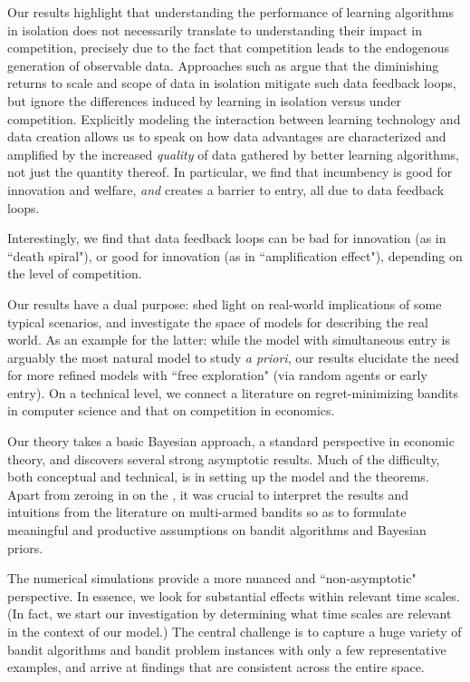 Our results highlight that understanding the performance of learning algorithms in isolation does not necessarily translate to understanding their impact in competition, precisely due to the fact that competition leads to the endogenous generation of observable data. Approaches such as \citet{lambrecht2015can, bajari2018impact, varian2018artificial} argue that the diminishing returns to scale and scope of data in isolation mitigate such data feedback loops,
but ignore the differences induced by learning in isolation versus under competition. Explicitly modeling the interaction between learning technology and data creation allows us to speak on how data advantages are characterized and amplified by the increased \emph{quality} of data gathered by better learning algorithms, not just the quantity thereof. In particular, we find that incumbency is good for innovation and welfare, \emph{and} %
creates a barrier to entry, 
all %
due to data feedback loops. 

Interestingly, we find that data feedback loops can be bad for innovation (as in ``death spiral"), or good for innovation (as in ``amplification effect"), depending on the level of competition.

Our results have a dual purpose: shed light on real-world implications of some typical scenarios, and investigate the space of models for describing the real world. As an example for the latter: while the \HardMax model with simultaneous entry is arguably the most natural model to study \emph{a priori}, our results elucidate the need for more refined models with ``free exploration" (\eg via random agents or early entry). On a technical level, we connect a literature on regret-minimizing bandits in computer science and that on competition in economics.

Our theory takes a basic Bayesian approach, a standard perspective in economic theory, and discovers several strong asymptotic results. Much of the difficulty, both conceptual and technical, is in setting up the model and the theorems. Apart from zeroing in on the \TheoryModel, it was crucial to interpret the results and intuitions from the literature on multi-armed bandits so as to formulate meaningful and productive assumptions on bandit algorithms and Bayesian priors.

The numerical simulations provide a more nuanced and ``non-asymptotic" perspective. In essence, we look for substantial effects within relevant time scales. (In fact, we start our investigation by determining what time scales are relevant in the context of our model.) The central challenge is to capture a huge variety of bandit algorithms and bandit problem instances with only a few representative examples, and arrive at findings that are consistent across the entire space.


